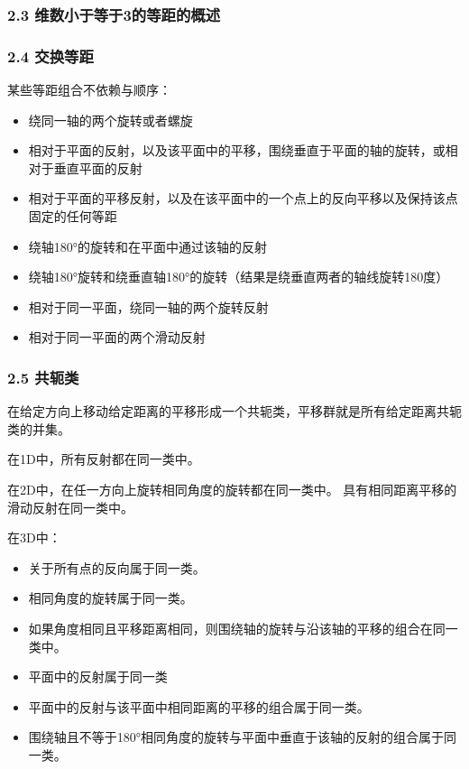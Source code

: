 \subsubsection{2.3 维数小于等于3的等距的概述}



\subsubsection{2.4 交换等距}

某些等距组合不依赖与顺序：

\begin{itemize}
\item 绕同一轴的两个旋转或者螺旋
\item 相对于平面的反射，以及该平面中的平移，围绕垂直于平面的轴的旋转，或相对于垂直平面的反射
\item 相对于平面的平移反射，以及在该平面中的一个点上的反向平移以及保持该点固定的任何等距
\item 绕轴180°的旋转和在平面中通过该轴的反射
\item 绕轴180°旋转和绕垂直轴180°的旋转（结果是绕垂直两者的轴线旋转180度）
\item 相对于同一平面，绕同一轴的两个旋转反射
\item 相对于同一平面的两个滑动反射
\end{itemize}


\subsubsection{2.5 共轭类}

在给定方向上移动给定距离的平移形成一个共轭类，平移群就是所有给定距离共轭类的并集。

在1D中，所有反射都在同一类中。

在2D中，在任一方向上旋转相同角度的旋转都在同一类中。 具有相同距离平移的滑动反射在同一类中。

在3D中：

\begin{itemize}
\item 关于所有点的反向属于同一类。
\item 相同角度的旋转属于同一类。
\item 如果角度相同且平移距离相同，则围绕轴的旋转与沿该轴的平移的组合在同一类中。
\item 平面中的反射属于同一类
\item 平面中的反射与该平面中相同距离的平移的组合属于同一类。
\item 围绕轴且不等于180°相同角度的旋转与平面中垂直于该轴的反射的组合属于同一类。
\end{itemize}


